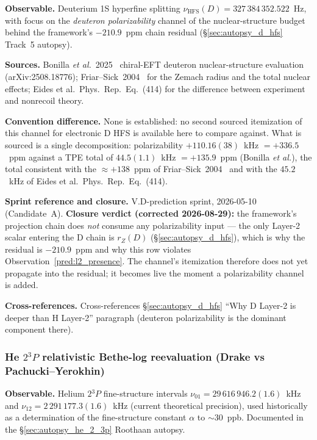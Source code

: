 \documentclass[11pt]{article}
\begin{document}
\textbf{Observable.}  Deuterium 1S hyperfine splitting
$\nu_\text{HFS}(D) = 327\,384\,352.522$~Hz, with focus on the
\emph{deuteron polarizability} channel of the nuclear-structure budget
behind the framework's $-210.9$~ppm chain residual
(\S\ref{sec:autopsy_d_hfs} Track~5 autopsy).

\textbf{Sources.}  Bonilla \emph{et al.}~2025~\cite{bonilla2025}
chiral-EFT deuteron nuclear-structure evaluation (arXiv:2508.18776);
Friar--Sick~2004~\cite{friar_sick2004} for the Zemach radius and the
total nuclear effects; Eides et al.\ Phys.\ Rep.\ Eq.~(414) for the
difference between experiment and nonrecoil theory.

\textbf{Convention difference.}  None is established: no second
sourced itemization of this channel for electronic D HFS is available
here to compare against.  What is sourced is a single decomposition:
polarizability $+110.16(38)$~kHz $= +336.5$~ppm against a TPE total
of $44.5(1.1)$~kHz $= +135.9$~ppm (Bonilla \emph{et al.}), the total
consistent with the $\approx +138$~ppm of
Friar--Sick~2004~\cite{friar_sick2004} and with the $45.2$~kHz of
Eides et al.\ Phys.\ Rep.\ Eq.~(414).

\textbf{Sprint reference and closure.}  V.D-prediction sprint, 2026-05-10 (Candidate~A).
\textbf{Closure verdict \textnormal{(corrected 2026-08-29)}:}
the framework's projection chain does \emph{not} consume any
polarizability input --- the only Layer-2 scalar entering the D chain
is $r_Z(D)$ (\S\ref{sec:autopsy_d_hfs}), which is why the residual is
$-210.9$~ppm and why this row violates
Observation~\ref{pred:l2_presence}.  The channel's itemization therefore
does not yet propagate into the residual; it becomes
live the moment a polarizability channel is added.

\textbf{Cross-references.}  Cross-references
\S\ref{sec:autopsy_d_hfs} ``Why D Layer-2 is deeper than H Layer-2''
paragraph (deuteron polarizability is the dominant component there).

\subsubsection{He $2{}^3P$ relativistic Bethe-log reevaluation (Drake vs Pachucki--Yerokhin)}
\label{sec:conv_he_bethe_log}

\textbf{Observable.}  Helium $2{}^3P$ fine-structure intervals
$\nu_{01} = 29\,616\,946.2(1.6)$~kHz and $\nu_{12} =
2\,291\,177.3(1.6)$~kHz (current theoretical precision), used
historically as a determination of the fine-structure constant
$\alpha$ to $\sim 30$~ppb.  Documented in the
\S\ref{sec:autopsy_he_2_3p} Roothaan autopsy.
\end{document}
